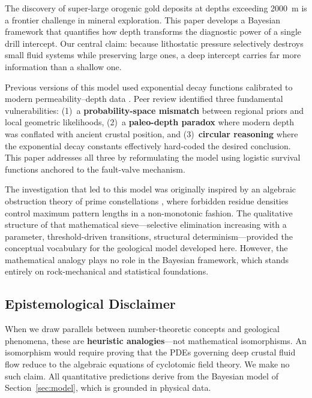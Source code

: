 \documentclass[11pt,a4paper]{article}
\begin{document}
The discovery of super-large orogenic gold deposits at depths exceeding 2000~m is a frontier challenge in mineral exploration.
This paper develops a Bayesian framework that quantifies how depth transforms the diagnostic power of a single drill intercept.
Our central claim: because lithostatic pressure selectively destroys small fluid systems while preserving large ones, a deep intercept carries far more information than a shallow one.

\begin{sloppypar}
Previous versions of this model used exponential decay functions calibrated to modern permeability--depth data \cite{Manning1999}.
Peer review identified three fundamental vulnerabilities:
(1)~a \textbf{probability-space mismatch} between regional priors and local geometric
likelihoods,
(2)~a \textbf{paleo-depth paradox} where modern depth was conflated with ancient crustal position, and
(3)~\textbf{circular reasoning} where the exponential decay constants effectively hard-coded the desired conclusion.
This paper addresses all three by reformulating the model using logistic survival functions anchored to the fault-valve mechanism.
\end{sloppypar}

The investigation that led to this model was originally inspired by an algebraic obstruction theory of prime constellations \cite{Chen2026a}, where forbidden residue densities control maximum pattern lengths in a non-monotonic fashion.
The qualitative structure of that mathematical sieve---selective elimination increasing with a parameter, threshold-driven transitions, structural determinism---provided the conceptual vocabulary for the geological model developed here.
However, the mathematical analogy plays no role in the Bayesian framework, which stands entirely on rock-mechanical and statistical foundations.

\subsection{Epistemological Disclaimer}

When we draw parallels between number-theoretic concepts and geological phenomena, these are \textbf{heuristic analogies}---not mathematical isomorphisms.
An isomorphism would require proving that the PDEs governing deep crustal fluid flow reduce to the algebraic equations of cyclotomic field theory.
We make no such claim.
All quantitative predictions derive from the Bayesian model of Section~\ref{sec:model}, which is grounded in physical data.
\end{document}
